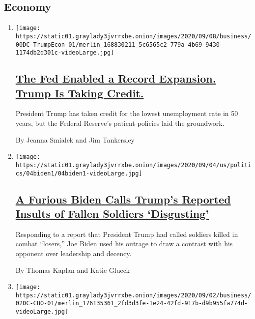 \hypertarget{economy}{%
\subsection{Economy}\label{economy}}

\begin{enumerate}
\def\labelenumi{\arabic{enumi}.}
\item
  \texttt{[image: https://static01.graylady3jvrrxbe.onion/images/2020/09/08/business/00DC-TrumpEcon-01/merlin\_168830211\_5c6565c2-779a-4b69-9430-1174db2d301c-videoLarge.jpg]}

  \hypertarget{the-fed-enabled-a-record-expansion-trump-is-taking-credit}{%
  \subsection{\texorpdfstring{\href{/2020/09/08/business/economy/trump-economy-fed.html}{The
  Fed Enabled a Record Expansion. Trump Is Taking
  Credit.}}{The Fed Enabled a Record Expansion. Trump Is Taking Credit.}}\label{the-fed-enabled-a-record-expansion-trump-is-taking-credit}}

  President Trump has taken credit for the lowest unemployment rate in
  50 years, but the Federal Reserve's patient policies laid the
  groundwork.

  By Jeanna Smialek and Jim Tankersley
\item
  \texttt{[image: https://static01.graylady3jvrrxbe.onion/images/2020/09/04/us/politics/04biden1/04biden1-videoLarge.jpg]}

  \hypertarget{a-furious-biden-calls-trumps-reported-insults-of-fallen-soldiers-disgusting}{%
  \subsection{\texorpdfstring{\href{/2020/09/04/us/politics/biden-trump-soliders-insults.html}{A
  Furious Biden Calls Trump's Reported Insults of Fallen Soldiers
  `Disgusting'}}{A Furious Biden Calls Trump's Reported Insults of Fallen Soldiers `Disgusting'}}\label{a-furious-biden-calls-trumps-reported-insults-of-fallen-soldiers-disgusting}}

  Responding to a report that President Trump had called soldiers killed
  in combat ``losers,'' Joe Biden used his outrage to draw a contrast
  with his opponent over leadership and decency.

  By Thomas Kaplan and Katie Glueck
\item
  \texttt{[image: https://static01.graylady3jvrrxbe.onion/images/2020/09/02/business/02DC-CBO-01/merlin\_176135361\_2fd3d3fe-1e24-42fd-917b-d9b955fa774d-videoLarge.jpg]}


\end{enumerate}
